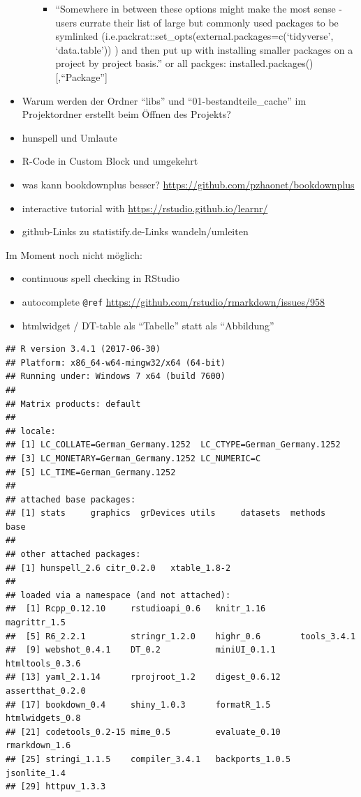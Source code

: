 \documentclass[]{book}
\providecommand{\tightlist}{%
  \setlength{\itemsep}{0pt}\setlength{\parskip}{0pt}}
\theoremstyle{definition}
\theoremstyle{definition}
\theoremstyle{remark}
\begin{document}
\begin{itemize}
\begin{itemize}
    \begin{itemize}
    \tightlist
    \item
      ``Somewhere in between these options might make the most sense -
      users currate their list of large but commonly used packages to be
      symlinked (i.e.packrat::set\_opts(external.packages=c(`tidyverse',
      `data.table')) ) and then put up with installing smaller packages
      on a project by project basis.'' or all packges:
      installed.packages(){[},``Package''{]}
    \end{itemize}
  \end{itemize}
\item
  Warum werden der Ordner ``libs'' und ``01-bestandteile\_cache'' im
  Projektordner erstellt beim Öffnen des Projekts?
\item
  hunspell und Umlaute
\item
  R-Code in Custom Block und umgekehrt
\item
  was kann bookdownplus besser?
  \url{https://github.com/pzhaonet/bookdownplus}
\item
  interactive tutorial with \url{https://rstudio.github.io/learnr/}
\item
  github-Links zu statistify.de-Links wandeln/umleiten
\end{itemize}

Im Moment noch nicht möglich:

\begin{itemize}
\tightlist
\item
  continuous spell checking in RStudio
\item
  autocomplete \texttt{@ref}
  \url{https://github.com/rstudio/rmarkdown/issues/958}
\item
  htmlwidget / DT-table als ``Tabelle'' statt als ``Abbildung''
\end{itemize}

\begin{verbatim}
## R version 3.4.1 (2017-06-30)
## Platform: x86_64-w64-mingw32/x64 (64-bit)
## Running under: Windows 7 x64 (build 7600)
## 
## Matrix products: default
## 
## locale:
## [1] LC_COLLATE=German_Germany.1252  LC_CTYPE=German_Germany.1252   
## [3] LC_MONETARY=German_Germany.1252 LC_NUMERIC=C                   
## [5] LC_TIME=German_Germany.1252    
## 
## attached base packages:
## [1] stats     graphics  grDevices utils     datasets  methods   base     
## 
## other attached packages:
## [1] hunspell_2.6 citr_0.2.0   xtable_1.8-2
## 
## loaded via a namespace (and not attached):
##  [1] Rcpp_0.12.10     rstudioapi_0.6   knitr_1.16       magrittr_1.5    
##  [5] R6_2.2.1         stringr_1.2.0    highr_0.6        tools_3.4.1     
##  [9] webshot_0.4.1    DT_0.2           miniUI_0.1.1     htmltools_0.3.6 
## [13] yaml_2.1.14      rprojroot_1.2    digest_0.6.12    assertthat_0.2.0
## [17] bookdown_0.4     shiny_1.0.3      formatR_1.5      htmlwidgets_0.8 
## [21] codetools_0.2-15 mime_0.5         evaluate_0.10    rmarkdown_1.6   
## [25] stringi_1.1.5    compiler_3.4.1   backports_1.0.5  jsonlite_1.4    
## [29] httpuv_1.3.3
\end{verbatim}


\end{document}

